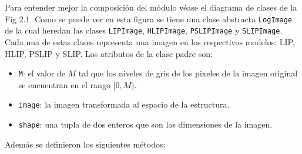 Para entender mejor la composici\'on del m\'odulo v\'ease el diagrama de clases de la Fig 2.1. Como se puede ver en esta figura se tiene una clase abstracta \verb|LogImage| de la cual heredan las clases \verb|LIPImage|, \verb|HLIPImage|, \verb|PSLIPImage| y \verb|SLIPImage|. Cada una de estas clases representa una imagen en los respectivos modelos: LIP, HLIP, PSLIP y SLIP. Los atributos de la clase padre son:

\begin{itemize}
	\item \verb|M|: el valor de $M$ tal que los niveles de gris de los pixeles de la imagen original se encuentran en el rango $[0,M)$.
	\item \verb|image|: la imagen transformada al espacio de la estructura.
	\item \verb|shape|: una tupla de dos enteros que son las dimensiones de la imagen.
\end{itemize}

Adem\'as se definieron los siguientes m\'etodos:

